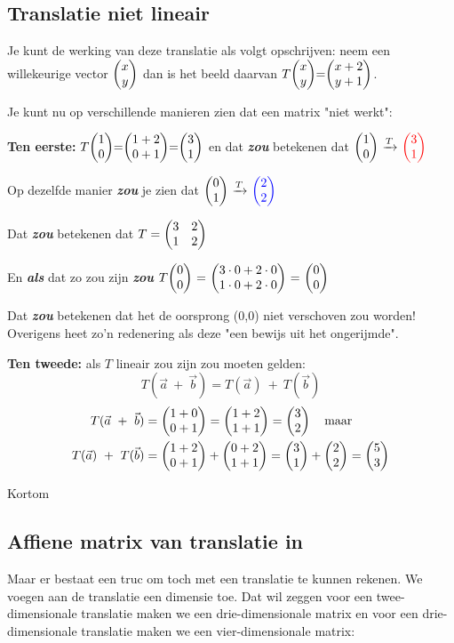 \subsection{Translatie niet lineair}

Je kunt de werking van deze translatie als volgt opschrijven: neem een willekeurige vector $\vectwee{x}{y} $ dan is het beeld daarvan $T\vectwee{x}{y} = \vectwee{x+2}{y+1} $.

Je kunt nu op verschillende manieren zien dat een matrix "niet werkt":

\textbf{ Ten eerste:} $ T \vectwee{1}{0} = \vectwee{1+2}{0+1} = \vectwee{3}{1} $ en dat \textit{\textbf{zou}} betekenen dat $\vectwee{1}{0} \ \xrightarrow{T} \ \vectwee[red]{3}{1} $ 

Op dezelfde manier \textit{\textbf{zou}} je zien dat $\vectwee{0}{1} \ \xrightarrow{T} \ \vectwee[blue]{2}{2} $ 

Dat \textbf{\textit{zou}} betekenen dat $T = \begin{pmatrix} 3&2 \\ 1&2 \end{pmatrix} $ 

En \textbf{\textit{als}} dat zo zou zijn \textbf{\textit{zou}} $T \vectwee{0}{0} \ =\ \vectwee{3\cdot 0 + 2\cdot 0}{1\cdot 0 + 2\cdot 0} \ =\ \vectwee{0}{0} $ 

Dat \textbf{\textit{zou}} betekenen dat het de oorsprong (0,0) niet verschoven zou worden! Overigens heet zo'n redenering als deze  "een bewijs uit het ongerijmde".

\textbf{Ten tweede:} als $T$ lineair zou zijn zou moeten gelden:
\[
    T(\vec{a} \ + \ \vec{b}) = T(\vec{a})\ +\ T(\vec{b})
\]    
\begin{align*} 
T(\vec{a}\ +\ \vec{b}) &= \begin{pmatrix} 1+0 \\ 0+1 \end{pmatrix} = \begin{pmatrix} 1+2 \\ 1+1 \end{pmatrix} = \begin{pmatrix} 3 \\ 2 \end{pmatrix} \quad \text{maar} \\
T(\vec{a})\ +\ T(\vec{b}) &= \begin{pmatrix} 1+2 \\ 0+1 \end{pmatrix} + \begin{pmatrix} 0+2 \\ 1+1 \end{pmatrix} = \begin{pmatrix} 3 \\ 1 \end{pmatrix} + \begin{pmatrix} 2 \\ 2 \end{pmatrix} = \begin{pmatrix} 5 \\ 3 \end{pmatrix}  
\end{align*} 

Kortom 

\subsection{Affiene  matrix van translatie in \RT}
Maar er bestaat een truc om  toch met een translatie te kunnen rekenen. We voegen aan de translatie een dimensie toe. Dat wil zeggen voor een twee-dimensionale translatie maken we een drie-dimensionale matrix en voor een drie-dimensionale translatie maken we een  vier-dimensionale matrix:

